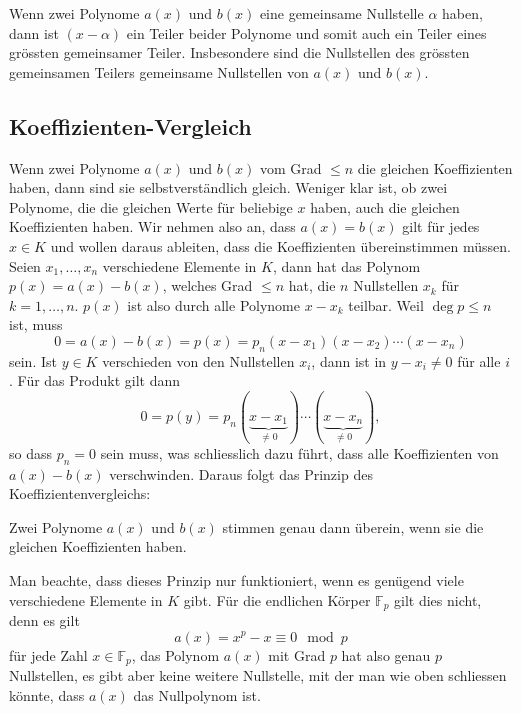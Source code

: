 Wenn zwei Polynome $a(x)$ und $b(x)$ eine gemeinsame Nullstelle $\alpha$
haben, dann ist $(x-\alpha)$ ein Teiler beider Polynome und somit auch
ein Teiler eines grössten gemeinsamer Teiler.
Insbesondere sind die Nullstellen des grössten gemeinsamen Teilers
gemeinsame Nullstellen von $a(x)$ und $b(x)$.

%
%
\subsection{Koeffizienten-Vergleich}
Wenn zwei Polynome $a(x)$ und $b(x)$ vom Grad $\le n$ die gleichen
Koeffizienten haben, dann sind sie selbstverständlich gleich.
Weniger klar ist, ob zwei Polynome, die die gleichen Werte für beliebige
$x$ haben, auch die gleichen Koeffizienten haben.
Wir nehmen also an, dass $a(x)=b(x)$ gilt für jedes $x\in K$ und
wollen daraus ableiten, dass die Koeffizienten übereinstimmen müssen.
Seien $x_1,\dots,x_n$ verschiedene Elemente in $K$, dann
hat das Polynom $p(x)=a(x)-b(x)$, welches Grad $\le n$ hat,
die $n$ Nullstellen $x_k$ für $k=1,\dots,n$.
$p(x)$ ist also durch alle Polynome $x-x_k$ teilbar.
Weil $\deg p\le n$ ist, muss 
\[
0
=
a(x)-b(x)
=
p(x)
=
p_n
(x-x_1)(x-x_2)\cdots (x-x_n)
\]
sein.
Ist $y\in K$ verschieden von den Nullstellen $x_i$, dann ist 
in $y-x_i\ne 0$ für alle $i$.
Für das Produkt gilt dann
\[
0
=
p(y) 
=
p_n
(\underbrace{x-x_1}_{\displaystyle \ne 0})
\cdots
(\underbrace{x-x_n}_{\displaystyle \ne 0}),
\]
so dass $p_n=0$ sein muss, was schliesslich dazu führt, dass alle
Koeffizienten von $a(x)-b(x)$ verschwinden.
Daraus folgt das Prinzip des Koeffizientenvergleichs:

\begin{satz}[Koeffizientenvergleich]
\label{buch:polynome:satz:koeffizientenvergleich}
Zwei Polynome $a(x)$ und $b(x)$ stimmen genau dann überein, wenn
sie die gleichen Koeffizienten haben.
\end{satz}

Man beachte, dass dieses Prinzip nur funktioniert, wenn es genügend
viele verschiedene Elemente in $K$ gibt.
Für die endlichen Körper $\mathbb{F}_p$ gilt dies nicht, denn es gilt
\[
a(x)
=
x^p-x\equiv 0\mod p
\]
für jede Zahl $x\in\mathbb{F}_p$, das Polynom $a(x)$ mit Grad $p$
hat also genau $p$ Nullstellen, es gibt aber keine weitere Nullstelle,
mit der man wie oben schliessen könnte, dass $a(x)$ das Nullpolynom ist.

%
%
